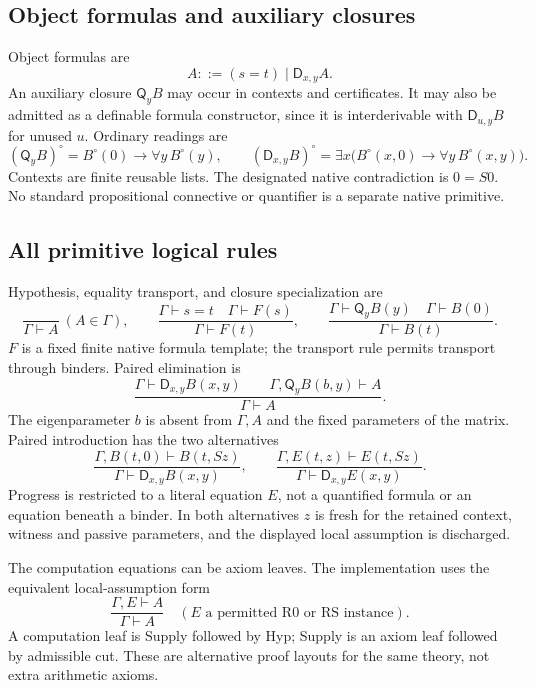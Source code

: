\documentclass[11pt,letterpaper]{article}
\theoremstyle{definition}\newtheorem{definition}[theorem]{Definition}
\theoremstyle{remark}\newtheorem{remark}[theorem]{Remark}
\newcommand{\D}{\mathsf D}
\newcommand{\Q}{\mathsf Q}
\begin{document}
\subsection{Object formulas and auxiliary closures}

Object formulas are
\[
              A ::= (s=t)\mid\D_{x,y}A.
\]
An auxiliary closure $\Q_yB$ may occur in contexts and certificates.
It may also be admitted as a definable formula constructor, since it is
interderivable with $\D_{u,y}B$ for unused $u$. Ordinary readings are
\[
 (\Q_yB)^\circ=B^\circ(0)\to\forall y\,B^\circ(y),\qquad
 (\D_{x,y}B)^\circ=
 \exists x\bigl(B^\circ(x,0)\to\forall y\,B^\circ(x,y)\bigr).
\]
Contexts are finite reusable lists. The designated native contradiction
is $0=S0$. No standard propositional connective or quantifier is a
separate native primitive.

\subsection{All primitive logical rules}

Hypothesis, equality transport, and closure specialization are
\[
 \frac{}{\Gamma\vdash A}\ (A\in\Gamma),\qquad
 \frac{\Gamma\vdash s=t\quad\Gamma\vdash F(s)}
      {\Gamma\vdash F(t)},\qquad
 \frac{\Gamma\vdash\Q_yB(y)\quad\Gamma\vdash B(0)}
      {\Gamma\vdash B(t)}.
 \tag{Hyp, Tr, QE}
\]
$F$ is a fixed finite native formula template; the transport rule
permits transport through binders. Paired elimination is
\[
 \frac{\Gamma\vdash\D_{x,y}B(x,y)\qquad
       \Gamma,\Q_yB(b,y)\vdash A}{\Gamma\vdash A}.
 \tag{DE}
\]
The eigenparameter $b$ is absent from $\Gamma,A$ and the fixed parameters
of the matrix. Paired introduction has the two alternatives
\[
 \frac{\Gamma,B(t,0)\vdash B(t,Sz)}
      {\Gamma\vdash\D_{x,y}B(x,y)},\qquad
 \frac{\Gamma,E(t,z)\vdash E(t,Sz)}
      {\Gamma\vdash\D_{x,y}E(x,y)}.
 \tag{DI-case, DI-progress}
\]
Progress is restricted to a literal equation $E$, not a quantified
formula or an equation beneath a binder. In both alternatives $z$ is
fresh for the retained context, witness and passive parameters, and the
displayed local assumption is discharged.

The computation equations can be axiom leaves. The implementation uses
the equivalent local-assumption form
\[
     \frac{\Gamma,E\vdash A}{\Gamma\vdash A}
     \quad(E\text{ a permitted R0 or RS instance}).\tag{Supply}
\]
A computation leaf is Supply followed by Hyp; Supply is an axiom leaf
followed by admissible cut. These are alternative proof layouts for the
same theory, not extra arithmetic axioms.
\end{document}

